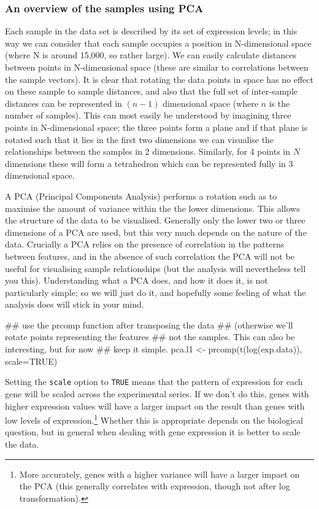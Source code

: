 \documentclass[11pt]{article}
\begin{document}
\subsubsection{An overview of the samples using PCA}
\label{sec-1-3-2}
Each sample in the data set is described by its set of expression levels; in this way we
can consider that each sample occupies a position in N-dimensional space (where N is
around 15,000, so rather large). We can easily calculate distances between points in
N-dimensional space (these are similar to correlations between the sample vectors). It
is clear that rotating the data points in space has no effect on these sample to
sample distances, and also that the full set of inter-sample distances can be represented
in $(n-1)$ dimensional space (where $n$ is the number of samples). This can most easily
be understood by imagining three points in N-dimensional space; the three points form
a plane and if that plane is rotated such that it lies in the first two dimensions
we can visualise the relationships between the samples in 2 dimensions. Similarly,
for 4 points in $N$ dimensions these will form a tetrahedron which can be represented
fully in 3 dimensional space.

A PCA (Principal Components Analysis) performs a rotation such as to maximise the
amount of variance within the the lower dimensions. This allows the structure of
the data to be visualised. Generally only the lower two or three dimensions of a
PCA are used, but this very much depends on the nature of the data. Crucially a PCA
relies on the presence of correlation in the patterns between features, and in
the absence of such correlation the PCA will not be useful for visualising sample
relationships (but the analysis will nevertheless tell you this). Understanding
what a PCA does, and how it does it, is not particularly simple; so we will just
do it, and hopefully some feeling of what the analysis does will stick in your mind.

\begin{rcode}
  ## use the prcomp function after transposing the data
  ## (otherwise we'll rotate points representing the features
  ## not the samples. This can also be interesting, but for now
  ## keep it simple.
  pca.l1 <- prcomp(t(log(exp.data)), scale=TRUE)
\end{rcode}

Setting the \texttt{scale} option to \texttt{TRUE} means that the pattern
of expression for each gene will be scaled across the experimental series.
If we don't do this, genes with higher expression values will have a larger
impact on the result than genes with low levels of expression.\footnote{
More accurately, genes with a higher variance will have a larger impact
on the PCA (this generally correlates with expression, though not
after log transformation).} Whether this is
appropriate depends on the biological question, but in general when dealing
with gene expression it is better to scale the data.
\end{document}
